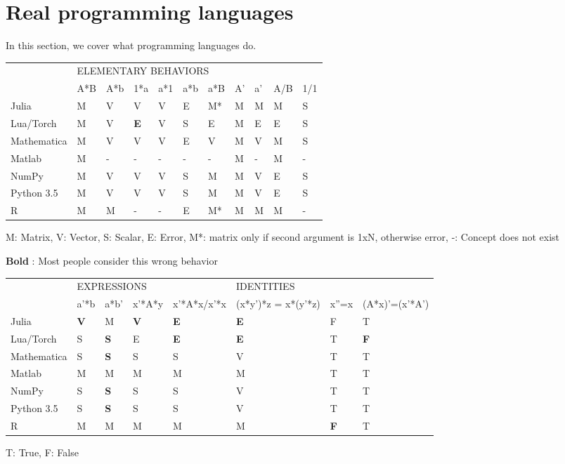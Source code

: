 \section{Real programming languages}

In this section, we cover what programming languages do.

\begin{tabular}{|l|l|l|l|l|l|l|l|l|l|l|}
\cline{2-11} 
\multicolumn{1}{l|}{} & \multicolumn{10}{l|}{ELEMENTARY BEHAVIORS}\tabularnewline
\cline{2-11} 
\multicolumn{1}{l|}{} & A{*}B & A{*}b & 1{*}a & a{*}1 & a{*}b & a{*}B & A' & a' & A/B & 1/1\tabularnewline
\hline 
Julia & M & V & V & V & E & M{*} & M & M & M & S\tabularnewline
\hline 
Lua/Torch & M & V & \textbf{E} & V & S & E & M & E & E & S\tabularnewline
\hline 
Mathematica & M & V & V & V & E & V & M & V & M & S\tabularnewline
\hline 
Matlab & M & - & - & - & - & - & M & - & M & -\tabularnewline
\hline 
NumPy & M & V & V & V & S & M & M & V & E & S\tabularnewline
\hline 
Python 3.5 & M & V & V & V & S & M & M & V & E & S\tabularnewline
\hline 
R & M & M & - & - & E & M{*} & M & M & M & -\tabularnewline
\hline 
\end{tabular}

M: Matrix, V: Vector, S: Scalar, E: Error, M{*}: matrix only if second
argument is 1xN, otherwise error, -: Concept does not exist

\textbf{Bold} : Most people consider this wrong behavior

\begin{tabular}{|l|l|l|l|l|l|l|l|}
\cline{2-8} 
\multicolumn{1}{l|}{} & \multicolumn{4}{l|}{EXPRESSIONS} & \multicolumn{3}{l|}{IDENTITIES}\tabularnewline
\cline{2-8} 
\multicolumn{1}{l|}{} & a'{*}b & a{*}b' & x'{*}A{*}y & x'{*}A{*}x/x'{*}x & (x{*}y'){*}z = x{*}(y'{*}z) & x''=x & (A{*}x)'=(x'{*}A')\tabularnewline
\hline 
Julia & \textbf{V} & M & \textbf{V} & \textbf{E} & \textbf{E} & F & T\tabularnewline
\hline 
Lua/Torch & S & \textbf{S} & E & \textbf{E} & \textbf{E} & T & \textbf{F}\tabularnewline
\hline 
Mathematica & S & \textbf{S} & S & S & V & T & T\tabularnewline
\hline 
Matlab & M & M & M & M & M & T & T\tabularnewline
\hline 
NumPy & S & \textbf{S} & S & S & V & T & T\tabularnewline
\hline 
Python 3.5 & S & \textbf{S} & S & S & V & T & T\tabularnewline
\hline 
R & M & M & M & M & M & \textbf{F} & T\tabularnewline
\hline 
\end{tabular}

T: True, F: False
